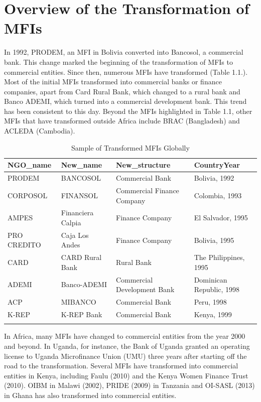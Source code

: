 \documentclass[a4paper, nobind]{templates/ociamthesis}
\begin{document}
\hypertarget{overview-of-the-transformation-of-mfis}{%
\section{Overview of the Transformation of MFIs}\label{overview-of-the-transformation-of-mfis}}

\noindent In 1992, PRODEM, an MFI in Bolivia converted into Bancosol, a commercial bank. This change marked the beginning of the transformation of MFIs to commercial entities. Since then, numerous MFIs have transformed (Table 1.1.). Most of the initial MFIs transformed into commercial banks or finance companies, apart from Card Rural Bank, which changed to a rural bank and Banco ADEMI, which turned into a commercial development bank. This trend has been consistent to this day. Beyond the MFIs highlighted in Table 1.1, other MFIs that have transformed outside Africa include BRAC (Bangladesh) and ACLEDA (Cambodia).

\begin{table}

\caption{\label{tab:unnamed-chunk-3}Sample of Transformed MFIs Globally}
\centering
\fontsize{9}{11}\selectfont
\begin{tabu} to 
\toprule
NGO\_name & New\_name & New\_structure & CountryYear\\
\midrule
PRODEM & BANCOSOL & Commercial Bank & Bolivia, 1992\\
CORPOSOL & FINANSOL & Commercial Finance Company & Colombia, 1993\\
AMPES & Financiera Calpia & Finance Company & El Salvador, 1995\\
PRO CREDITO & Caja Los Andes & Finance Company & Bolivia, 1995\\
CARD & CARD Rural Bank & Rural Bank & The Philippines, 1995\\
\addlinespace
ADEMI & Banco-ADEMI & Commercial Development Bank & Dominican Republic, 1998\\
ACP & MIBANCO & Commercial Bank & Peru, 1998\\
K-REP & K-REP Bank & Commercial Bank & Kenya, 1999\\
\bottomrule
{}\\
\end{tabu}
\end{table}

In Africa, many MFIs have changed to commercial entities from the year 2000 and beyond. In Uganda, for instance, the Bank of Uganda granted an operating license to Uganda Microfinance Union (UMU) three years after starting off the road to the transformation. Several MFIs have transformed into commercial entities in Kenya, including Faulu (2010) and the Kenya Women Finance Trust (2010). OIBM in Malawi (2002), PRIDE (2009) in Tanzania and OI-SASL (2013) in Ghana has also transformed into commercial entities.
\end{document}
